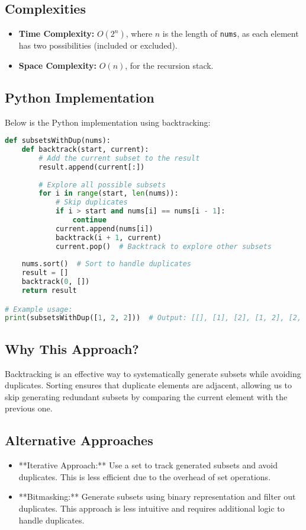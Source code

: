 \subsection*{Complexities}
\begin{itemize}
    \item \textbf{Time Complexity:} \(O(2^n)\), where \(n\) is the length of \texttt{nums}, as each element has two possibilities (included or excluded).
    \item \textbf{Space Complexity:} \(O(n)\), for the recursion stack.
\end{itemize}

\subsection*{Python Implementation}
Below is the Python implementation using backtracking:

\begin{fullwidth}
\begin{lstlisting}[language=Python]
def subsetsWithDup(nums):
    def backtrack(start, current):
        # Add the current subset to the result
        result.append(current[:])
        
        # Explore all possible subsets
        for i in range(start, len(nums)):
            # Skip duplicates
            if i > start and nums[i] == nums[i - 1]:
                continue
            current.append(nums[i])
            backtrack(i + 1, current)
            current.pop()  # Backtrack to explore other subsets
    
    nums.sort()  # Sort to handle duplicates
    result = []
    backtrack(0, [])
    return result

# Example usage:
print(subsetsWithDup([1, 2, 2]))  # Output: [[], [1], [2], [1, 2], [2, 2], [1, 2, 2]]
\end{lstlisting}
\end{fullwidth}

\subsection*{Why This Approach?}
Backtracking is an effective way to systematically generate subsets while avoiding duplicates. Sorting ensures that duplicate elements are adjacent, allowing us to skip generating redundant subsets by comparing the current element with the previous one.

\subsection*{Alternative Approaches}
\begin{itemize}
    \item **Iterative Approach:** Use a set to track generated subsets and avoid duplicates. This is less efficient due to the overhead of set operations.
    \item **Bitmasking:** Generate subsets using binary representation and filter out duplicates. This approach is less intuitive and requires additional logic to handle duplicates.
\end{itemize}

